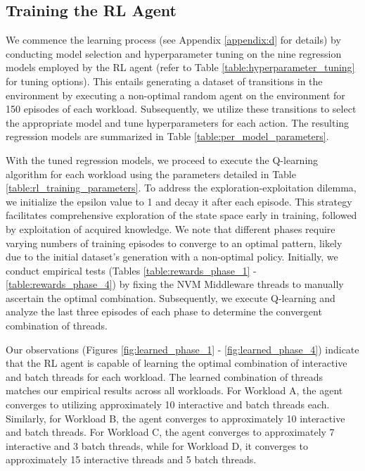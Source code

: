 \subsection*{Training the RL Agent}

We commence the learning process (see Appendix \ref{appendix:d} for details) by conducting model selection and hyperparameter tuning on the nine regression models employed by the RL agent (refer to Table \ref{table:hyperparameter_tuning} for tuning options). This entails generating a dataset of transitions in the environment by executing a non-optimal random agent on the environment for 150 episodes of each workload. Subsequently, we utilize these transitions to select the appropriate model and tune hyperparameters for each action. The resulting regression models are summarized in Table \ref{table:per_model_parameters}.

With the tuned regression models, we proceed to execute the Q-learning algorithm for each workload using the parameters detailed in Table \ref{table:rl_training_parameters}. To address the exploration-exploitation dilemma, we initialize the epsilon value to 1 and decay it after each episode. This strategy facilitates comprehensive exploration of the state space early in training, followed by exploitation of acquired knowledge. We note that different phases require varying numbers of training episodes to converge to an optimal pattern, likely due to the initial dataset's generation with a non-optimal policy. Initially, we conduct empirical tests (Tables \ref{table:rewards_phase_1} - \ref{table:rewards_phase_4}) by fixing the NVM Middleware threads to manually ascertain the optimal combination. Subsequently, we execute Q-learning and analyze the last three episodes of each phase to determine the convergent combination of threads.

Our observations (Figures \ref{fig:learned_phase_1} - \ref{fig:learned_phase_4}) indicate that the RL agent is capable of learning the optimal combination of interactive and batch threads for each workload. The learned combination of threads matches our empirical results across all workloads. For Workload A, the agent converges to utilizing approximately 10 interactive and batch threads each. Similarly, for Workload B, the agent converges to approximately 10 interactive and batch threads. For Workload C, the agent converges to approximately 7 interactive and 3 batch threads, while for Workload D, it converges to approximately 15 interactive threads and 5 batch threads.

